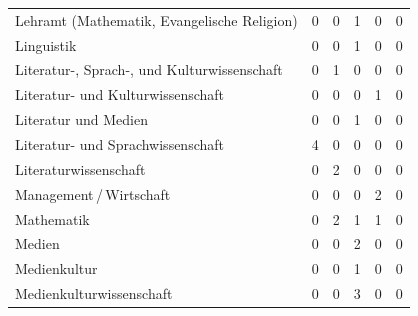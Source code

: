 \documentclass{scrartcl}
\begin{document}
\begin{landscape}
\begin{longtable}{L{7.5cm}ccccc}
      Lehramt (Mathematik, Evangelische Religion)             & 0                     &  0                       &  1                       & 0                    & 0                       \\
      Linguistik                                              & 0                     &  0                       &  1                       & 0                    & 0                       \\
      Literatur-, Sprach-, und Kulturwissenschaft             & 0                     &  1                       &  0                       & 0                    & 0                       \\
      Literatur- und Kulturwissenschaft                       & 0                     &  0                       &  0                       & 1                    & 0                       \\
      Literatur und Medien                                    & 0                     &  0                       &  1                       & 0                    & 0                       \\
      Literatur- und Sprachwissenschaft                       & 4                     &  0                       &  0                       & 0                    & 0                       \\
      Literaturwissenschaft                                   & 0                     &  2                       &  0                       & 0                    & 0                       \\
      Management\,/\,Wirtschaft                               & 0                     &  0                       &  0                       & 2                    & 0                       \\
      Mathematik                                              & 0                     &  2                       &  1                       & 1                    & 0                       \\
      Medien                                                  & 0                     &  0                       &  2                       & 0                    & 0                       \\
      Medienkultur                                            & 0                     &  0                       &  1                       & 0                    & 0                       \\
      Medienkulturwissenschaft                                & 0                     &  0                       &  3                       & 0                    & 0                       \\

\end{longtable}
\end{landscape}
\end{document}
